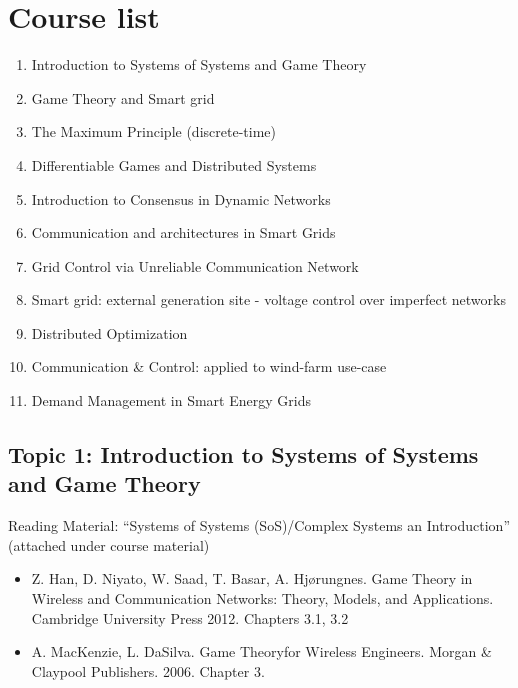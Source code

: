 \chapter*{Course list} %
\begin{enumerate}
        \item Introduction to Systems of Systems and Game Theory
        \item Game Theory and Smart grid
        \item The Maximum Principle (discrete-time)
        \item Differentiable Games and Distributed Systems
        \item Introduction to Consensus in Dynamic Networks
        \item Communication and architectures in Smart Grids
        \item Grid Control via Unreliable Communication Network
        \item Smart grid: external generation site - voltage control over imperfect networks
        \item Distributed Optimization
        \item Communication \& Control: applied to wind-farm use-case
        \item Demand Management in Smart Energy Grids
\end{enumerate}

\section*{Topic 1: Introduction to Systems of Systems and Game Theory}

Reading Material: ``Systems of Systems (SoS)/Complex Systems an Introduction'' (attached under course material)

\begin{itemize}
        \item Z. Han, D. Niyato, W. Saad, T. Basar, A. Hjørungnes. Game Theory in Wireless and Communication Networks: Theory, Models, and Applications. Cambridge University Press 2012. Chapters 3.1, 3.2
        \item A. MacKenzie, L. DaSilva. Game Theoryfor Wireless Engineers. Morgan \& Claypool Publishers. 2006. Chapter 3.
\end{itemize}
